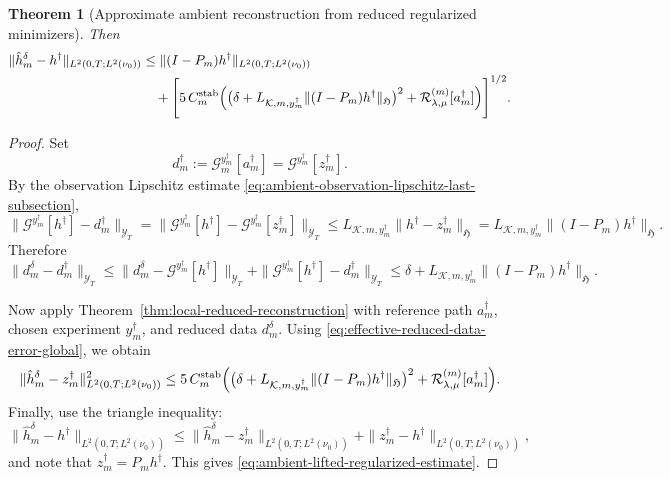 \documentclass{article}
\newtheorem{theorem}{Theorem}[section]
\theoremstyle{definition}
\begin{document}
\begin{theorem}[Approximate ambient reconstruction from reduced regularized minimizers]
    Then
    \begin{align}
        \label{eq:ambient-lifted-regularized-estimate}
        \|\hat h_m^\delta-h^\dagger\|_{L^2(0,T;L^2(\nu_0))}
         & \le
        \|(I-P_m)h^\dagger\|_{L^2(0,T;L^2(\nu_0))} \notag \\
         & \quad
        +
        \Biggl[
        5\,C_m^{\mathrm{stab}}
        \Bigl(
        \bigl(\delta + L_{\mathcal K,m,y_m^\dagger}\|(I-P_m)h^\dagger\|_{\mathfrak H}\bigr)^2
        +
        \mathcal R_{\lambda,\mu}^{(m)}[a_m^\dagger]
        \Bigr)
        \Biggr]^{1/2}.
    \end{align}
\end{theorem}

\begin{proof}
    Set
    \[
        d_m^\dagger:=\mathcal G_m^{y_m^\dagger}[a_m^\dagger]
        =\mathcal G^{y_m^\dagger}[z_m^\dagger].
    \]
    By the observation Lipschitz estimate
    \eqref{eq:ambient-observation-lipschitz-last-subsection},
    \[
        \|\mathcal G^{y_m^\dagger}[h^\dagger]-d_m^\dagger\|_{\mathcal Y_T}
        =
        \|\mathcal G^{y_m^\dagger}[h^\dagger]-\mathcal G^{y_m^\dagger}[z_m^\dagger]\|_{\mathcal Y_T}
        \le
        L_{\mathcal K,m,y_m^\dagger}\|h^\dagger-z_m^\dagger\|_{\mathfrak H}
        =
        L_{\mathcal K,m,y_m^\dagger}\|(I-P_m)h^\dagger\|_{\mathfrak H}.
    \]
    Therefore
    \begin{equation}
        \label{eq:effective-reduced-data-error-global}
        \|d_m^\delta-d_m^\dagger\|_{\mathcal Y_T}
        \le
        \|d_m^\delta-\mathcal G^{y_m^\dagger}[h^\dagger]\|_{\mathcal Y_T}
        +
        \|\mathcal G^{y_m^\dagger}[h^\dagger]-d_m^\dagger\|_{\mathcal Y_T}
        \le
        \delta + L_{\mathcal K,m,y_m^\dagger}\|(I-P_m)h^\dagger\|_{\mathfrak H}.
    \end{equation}

    Now apply Theorem~\ref{thm:local-reduced-reconstruction} with reference path
    \(a_m^\dagger\), chosen experiment \(y_m^\dagger\), and reduced data \(d_m^\delta\). Using
    \eqref{eq:effective-reduced-data-error-global}, we obtain
    \[
        \|\hat h_m^\delta-z_m^\dagger\|_{L^2(0,T;L^2(\nu_0))}^2
        \le
        5\,C_m^{\mathrm{stab}}
        \Bigl(
        \bigl(\delta + L_{\mathcal K,m,y_m^\dagger}\|(I-P_m)h^\dagger\|_{\mathfrak H}\bigr)^2
        +
        \mathcal R_{\lambda,\mu}^{(m)}[a_m^\dagger]
        \Bigr).
    \]
    Finally, use the triangle inequality:
    \[
        \|\hat h_m^\delta-h^\dagger\|_{L^2(0,T;L^2(\nu_0))}
        \le
        \|\hat h_m^\delta-z_m^\dagger\|_{L^2(0,T;L^2(\nu_0))}
        +
        \|z_m^\dagger-h^\dagger\|_{L^2(0,T;L^2(\nu_0))},
    \]
    and note that \(z_m^\dagger=P_m h^\dagger\). This gives
    \eqref{eq:ambient-lifted-regularized-estimate}.
\end{proof}
\end{document}
